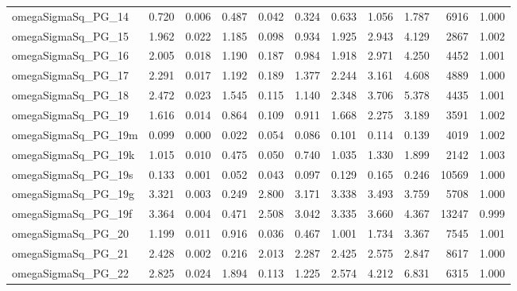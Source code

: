 \documentclass[12pt]{article}
\begin{document}
\begin{longtable}{lrrrrrrrrrr}
omegaSigmaSq\_PG\_14  & 0.720 & 0.006 & 0.487 & 0.042 & 0.324 & 0.633 & 1.056 & 1.787 &  6916 & 1.000 \\
omegaSigmaSq\_PG\_15  & 1.962 & 0.022 & 1.185 & 0.098 & 0.934 & 1.925 & 2.943 & 4.129 &  2867 & 1.002 \\
omegaSigmaSq\_PG\_16  & 2.005 & 0.018 & 1.190 & 0.187 & 0.984 & 1.918 & 2.971 & 4.250 &  4452 & 1.001 \\
omegaSigmaSq\_PG\_17  & 2.291 & 0.017 & 1.192 & 0.189 & 1.377 & 2.244 & 3.161 & 4.608 &  4889 & 1.000 \\
omegaSigmaSq\_PG\_18  & 2.472 & 0.023 & 1.545 & 0.115 & 1.140 & 2.348 & 3.706 & 5.378 &  4435 & 1.001 \\
omegaSigmaSq\_PG\_19  & 1.616 & 0.014 & 0.864 & 0.109 & 0.911 & 1.668 & 2.275 & 3.189 &  3591 & 1.002 \\
omegaSigmaSq\_PG\_19m & 0.099 & 0.000 & 0.022 & 0.054 & 0.086 & 0.101 & 0.114 & 0.139 &  4019 & 1.002 \\
omegaSigmaSq\_PG\_19k & 1.015 & 0.010 & 0.475 & 0.050 & 0.740 & 1.035 & 1.330 & 1.899 &  2142 & 1.003 \\
omegaSigmaSq\_PG\_19s & 0.133 & 0.001 & 0.052 & 0.043 & 0.097 & 0.129 & 0.165 & 0.246 & 10569 & 1.000 \\
omegaSigmaSq\_PG\_19g & 3.321 & 0.003 & 0.249 & 2.800 & 3.171 & 3.338 & 3.493 & 3.759 &  5708 & 1.000 \\
omegaSigmaSq\_PG\_19f & 3.364 & 0.004 & 0.471 & 2.508 & 3.042 & 3.335 & 3.660 & 4.367 & 13247 & 0.999 \\
omegaSigmaSq\_PG\_20  & 1.199 & 0.011 & 0.916 & 0.036 & 0.467 & 1.001 & 1.734 & 3.367 &  7545 & 1.001 \\
omegaSigmaSq\_PG\_21  & 2.428 & 0.002 & 0.216 & 2.013 & 2.287 & 2.425 & 2.575 & 2.847 &  8617 & 1.000 \\
omegaSigmaSq\_PG\_22  & 2.825 & 0.024 & 1.894 & 0.113 & 1.225 & 2.574 & 4.212 & 6.831 &  6315 & 1.000 \\
\end{longtable}
\endgroup


\newpage
\end{document}
